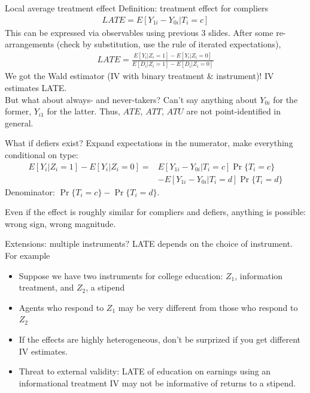 \documentclass[notes=show,beamer,compress]{beamer}
\begin{document}
\begin{frame}{Local average treatment effect}
	Definition: treatment effect for compliers
	\begin{align*}
		LATE = E[Y_{1i} - Y_{0i}|T_i=c]
	\end{align*}
	This can be expressed via observables using previous 3 slides. After some re-arrangements (check by substitution, use the rule of iterated expectations),
	\begin{align*}
		LATE = \frac{E[Y_i|Z_i=1] - E[Y_i|Z_i=0]}{E[D_i|Z_i=1] - E[D_i|Z_i=0]}
	\end{align*}
	We got the Wald estimator (IV with binary treatment \& instrument)! IV estimates LATE.\\\bigskip
	But what about always- and never-takers? Can't say anything about $Y_{0i}$ for the former, $Y_{i1}$ for the latter. Thus, $ATE$, $ATT$, $ATU$ are not point-identified in general.
\end{frame}

\begin{frame}{What if defiers exist?}
  Expand expectations in the numerator, make everything conditional on type:
	\begin{align*}
		E[Y_i|Z_i=1] - E[Y_i|Z_i=0] = &E[Y_{1i} - Y_{0i}|T_i=c]\Pr\{T_i=c\}\\ 
		&- E[Y_{1i} - Y_{0i}|T_i=d]\Pr\{T_i=d\}
	\end{align*}
	Denominator: $\Pr\{T_i=c\} - \Pr\{T_i=d\}$.
	
	Even if the effect is roughly similar for compliers and defiers, anything is possible: wrong sign, wrong magnitude.
\end{frame}

\begin{frame}{Extensions: multiple instruments?}
	LATE depends on the choice of instrument. For example
	\begin{itemize}
		\item Suppose we have two instruments for college education: $Z_1$, information treatment, and $Z_2$, a stipend
		\item Agents who respond to $Z_1$ may be very different from those who respond to $Z_2$
		\item If the effects are highly heterogeneous, don't be surprized if you get different IV estimates.
		\item Threat to external validity: LATE of education on earnings using an informational treatment IV may not be informative of returns to a stipend.
	\end{itemize}
\end{frame}
\end{document}
